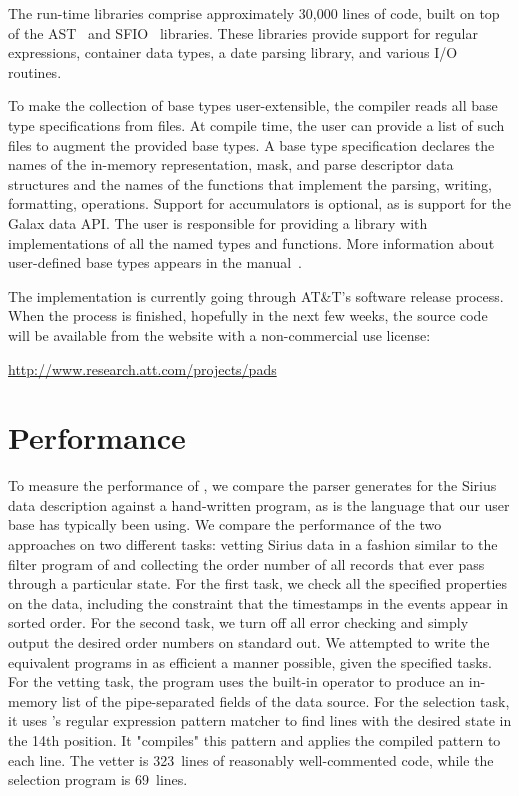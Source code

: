 \documentclass{sig-alternate}
\newcommand{\dibbler}{Sirius}
\begin{document}
The \pads{} run-time libraries comprise approximately 30,000 lines of \C{} code, built on top of the AST~\cite{ast} and SFIO~\cite{sfio} libraries.
These libraries provide support for regular expressions, container data types, a date parsing library, and various I/O routines.  
 
To make the collection of base types user-extensible, the compiler reads all base type specifications from files.  
At compile time, the user can provide a list of such files to augment the provided base types.
A base type specification
declares the names of the in-memory representation, mask, and parse descriptor data structures and the names of the functions that implement the parsing, writing, formatting, \etc{} operations.  Support for accumulators is optional, as is support for the Galax data API.  The user is responsible for providing a \C{} library with implementations of all the named types and functions. 
More information about user-defined base types appears in the \pads{} manual~\cite{padsmanual}.

The \pads{} implementation is currently going through AT\&T's software
release process.  When the process is finished, hopefully in the next few weeks, the source code will be available from the \pads{} website with a non-commercial use license:
\begin{center}
\url{http://www.research.att.com/projects/pads}
\end{center}
 
\section{Performance}
To measure the performance of \pads{}, we compare the parser \pads{} generates for the \dibbler{} data description against a hand-written \perl{} program, as \perl{} is the language that our user base has typically been using. We compare the performance of the two approaches on two different tasks: vetting \dibbler{} data in a fashion similar to the filter program of
 and collecting the order number of all records that ever pass through a particular state.  For the first task, we check all the specified properties on the data, including the constraint that the timestamps in the events appear in sorted order.  For the second task, we turn off all error checking and simply output the desired order numbers on standard out.
We attempted to write the equivalent \perl{} programs in as efficient a manner possible, given the specified tasks.  For the vetting task, the \perl{} program uses the built-in  operator to produce an in-memory list of the pipe-separated fields of the data source.  For the selection task, it uses \perl{}'s regular expression pattern matcher to find lines with the desired state in the 14th position.  It "compiles" this pattern and applies the compiled pattern to each line.  The \perl{} vetter is 323~lines of reasonably well-commented \perl{} code, while the selection program is 69~lines.  
\end{document}
